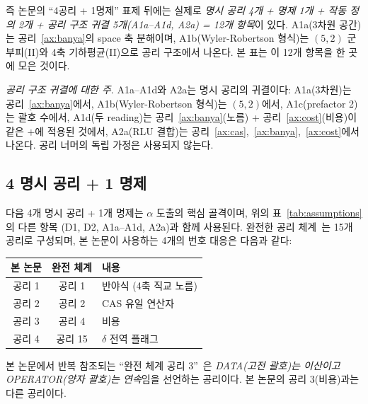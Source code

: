 \documentclass[entropy,article,submit,pdftex,oneauthor]{Definitions/mdpi}
\begin{document}
즉 논문의 ``4공리 + 1명제'' 표제 뒤에는 실제로 \emph{명시 공리 4개 + 명제 1개 + 작동 정의 2개 + 공리 구조 귀결 5개(A1a--A1d, A2a) = 12개 항목}이 있다. A1a(3차원 공간)는 공리~\ref{ax:banya}의 space 축 분해이며, A1b(Wyler-Robertson 형식)는 $(5,2)$ 군 부피(II)와 4축 기하평균(II)으로 공리 구조에서 나온다. 본 표는 이 12개 항목을 한 곳에 모은 것이다.

\textit{공리 구조 귀결에 대한 주}. A1a--A1d와 A2a는 명시 공리의 귀결이다: A1a(3차원)는 공리~\ref{ax:banya}에서, A1b(Wyler-Robertson 형식)는 $(5,2)$에서, A1c(prefactor 2)는 괄호 수에서, A1d(두 reading)는 공리~\ref{ax:banya}(노름) + 공리~\ref{ax:cost}(비용)이 같은 $+$에 적용된 것에서, A2a(RLU 결합)는 공리~\ref{ax:cas},~\ref{ax:banya},~\ref{ax:cost}에서 나온다. 공리 너머의 독립 가정은 사용되지 않는다.

\subsection{4 명시 공리 + 1 명제}

다음 4개 명시 공리 + 1개 명제는 $\alpha$ 도출의 핵심 골격이며, 위의 표~\ref{tab:assumptions}의 다른 항목 (D1, D2, A1a--A1d, A2a)과 함께 사용된다. 완전한 공리 체계~\cite{han2026}는 15개 공리로 구성되며, 본 논문이 사용하는 4개의 번호 대응은 다음과 같다:

\begin{center}
\small
\begin{tabular}{ccl}
\toprule
\textbf{본 논문} & \textbf{완전 체계} & \textbf{내용} \\
\midrule
공리 1 & 공리 1 & 반야식 (4축 직교 노름) \\
공리 2 & 공리 2 & CAS 유일 연산자 \\
공리 3 & 공리 4 & 비용 \\
공리 4 & 공리 15 & $\delta$ 전역 플래그 \\
\bottomrule
\end{tabular}
\end{center}

\noindent 본 논문에서 반복 참조되는 ``완전 체계 공리 3''~\cite{han2026}은 \emph{DATA(고전 괄호)는 이산이고 OPERATOR(양자 괄호)는 연속}임을 선언하는 공리이다. 본 논문의 공리 3(비용)과는 다른 공리이다.
\end{document}
